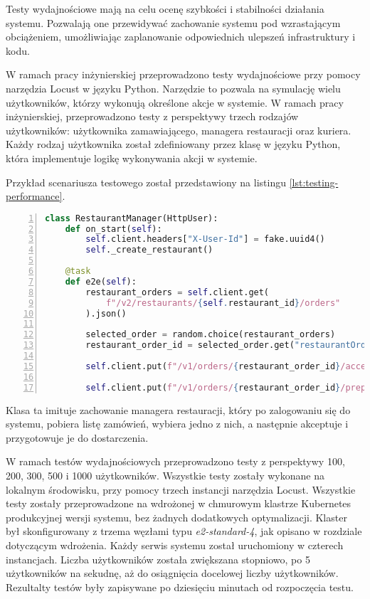 Testy wydajnościowe mają na celu ocenę szybkości i stabilności działania systemu. Pozwalają one przewidywać zachowanie systemu pod wzrastającym obciążeniem, umożliwiając zaplanowanie odpowiednich ulepszeń infrastruktury i kodu.

W ramach pracy inżynierskiej przeprowadzono testy wydajnościowe przy pomocy narzędzia Locust \cite{locust} w języku Python. Narzędzie to pozwala na symulację wielu użytkowników, którzy wykonują określone akcje w systemie. W ramach pracy inżynierskiej, przeprowadzono testy z perspektywy trzech rodzajów użytkowników: użytkownika zamawiającego, managera restauracji oraz kuriera. Każdy rodzaj użytkownika został zdefiniowany przez klasę w języku Python, która implementuje logikę wykonywania akcji w systemie. 

Przykład scenariusza testowego został przedstawiony na listingu \ref{lst:testing-performance}.

\begin{lstlisting}[caption={Scenariusz testowy w ramach testów wydajnościowych obsługujących managera restauracji},label={lst:testing-performance},captionpos=b,language=Python,numbers=left]
class RestaurantManager(HttpUser):
    def on_start(self):
        self.client.headers["X-User-Id"] = fake.uuid4()
        self._create_restaurant()

    @task
    def e2e(self):
        restaurant_orders = self.client.get(
            f"/v2/restaurants/{self.restaurant_id}/orders"
        ).json()

        selected_order = random.choice(restaurant_orders)
        restaurant_order_id = selected_order.get("restaurantOrderId")

        self.client.put(f"/v1/orders/{restaurant_order_id}/accept")

        self.client.put(f"/v1/orders/{restaurant_order_id}/prepare" )
\end{lstlisting}

Klasa ta imituje zachowanie managera restauracji, który po zalogowaniu się do systemu, pobiera listę zamówień, wybiera jedno z nich, a następnie akceptuje i przygotowuje je do dostarczenia.

W ramach testów wydajnościowych przeprowadzono testy z perspektywy 100, 200, 300, 500 i 1000 użytkowników. Wszystkie testy zostały wykonane na lokalnym środowisku, przy pomocy trzech instancji narzędzia Locust. Wszystkie testy zostały przeprowadzone na wdrożonej w chmurowym klastrze Kubernetes produkcyjnej wersji systemu, bez żadnych dodatkowych optymalizacji. Klaster był skonfigurowany z trzema węzłami typu \textit{e2-standard-4}, jak opisano w rozdziale dotyczącym wdrożenia. Każdy serwis systemu został uruchomiony w czterech instancjach. Liczba użytkowników została zwiększana stopniowo, po 5 użytkowników na sekudnę, aż do osiągnięcia docelowej liczby użytkowników. Rezultalty testów były zapisywane po dziesięciu minutach od rozpoczęcia testu. 

